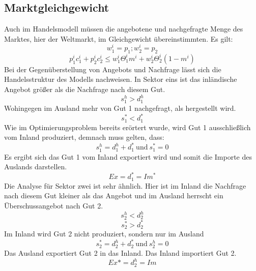 \subsection{Marktgleichgewicht}
Auch im Handelsmodell m{\"u}ssen die angebotene und nachgefragte Menge des Marktes, hier der Weltmarkt, im Gleichgewicht {\"u}bereinstimmten. Es gilt: 
\begin{displaymath}w_1^i=p_1; w_2^i=p_2\end{displaymath}
\begin{equation} p_1^ic_1^i+p_2^ic_2^i\leq w_1^i \Theta_1 ^im^i+w_2^i\Theta_2^i(1-m^i)\end{equation}
Bei der Gegen{\"u}berstellung von Angebots und Nachfrage l{\"a}sst sich die Handelsstruktur des Modells nachweisen. In Sektor eins ist das inl{\"a}ndische Angebot gr{\"o}{\ss}er als die Nachfrage nach diesem Gut. 
\begin{displaymath}s_1^h>d_1^h\end{displaymath}
Wohingegen im Ausland mehr von Gut 1 nachgefragt, als hergestellt wird. 
\begin{displaymath} s_1^*<d_1^*\end{displaymath}
Wie im Optimierungsproblem bereits er{\"o}rtert wurde, wird Gut 1 ausschlie{\ss}lich vom Inland produziert, demnach muss gelten, dass:
\begin{displaymath}s_1^h=d_1^h+d_1^* ~\text{und}~ s_1^*=0\end{displaymath}
Es ergibt sich das Gut 1 vom Inland exportiert wird und somit die Importe des Auslands darstellen. 
\begin{displaymath}Ex = d_1^*=Im^*\end{displaymath}
Die Analyse f{\"u}r Sektor zwei ist sehr {\"a}hnlich. Hier ist im Inland die Nachfrage nach diesem Gut kleiner als das Angebot und im Ausland herrscht ein {\"U}berschussangebot nach Gut 2.
\begin{displaymath}s_2^h<d_2^h\end{displaymath}
\begin{displaymath} s_2^*>d_2^*\end{displaymath}
Im Inland wird Gut 2 nicht produziert, sondern nur im Ausland
\begin{displaymath}s_2^*=d_2^h+d_2^*~ \text{und} ~s_2^h=0\end{displaymath}
Das Ausland exportiert Gut 2 in das Inland. Das Inland importiert Gut 2. 
\begin{displaymath}Ex*=d_2^h=Im\end{displaymath}
